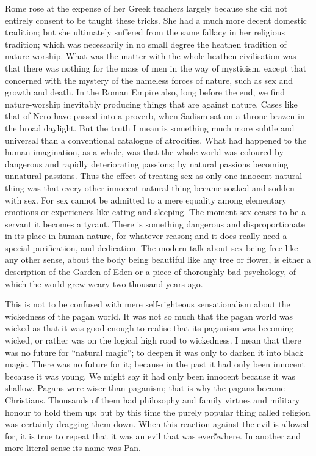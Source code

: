 \documentclass{book}
\begin{document}
Rome rose at the expense of her Greek teachers largely because she did not entirely consent to be taught these tricks. She had a much more decent domestic tradition; but she ultimately suffered from the same fallacy in her religious tradition; which was necessarily in no small degree the heathen tradition of nature-worship. What was the matter with the whole heathen civilisation was that there was nothing for the mass of men in the way of mysticism, except that concerned with the mystery of the nameless forces of nature, such as sex and growth and death. In the Roman Empire also, long before the end, we find nature-worship inevitably producing things that are against nature. Cases like that of Nero have passed into a proverb, when Sadism sat on a throne brazen in the broad daylight. But the truth I mean is something much more subtle and universal than a conventional catalogue of atrocities. What had happened to the human imagination, as a whole, was that the whole world was coloured by dangerous and rapidly deteriorating passions; by natural passions becoming unnatural passions. Thus the effect of treating sex as only one innocent natural thing was that every other innocent natural thing became soaked and sodden with sex. For sex cannot be admitted to a mere equality among elementary emotions or experiences like eating and sleeping. The moment sex ceases to be a servant it becomes a tyrant. There is something dangerous and disproportionate in its place in human nature, for whatever reason; and it does really need a special purification, and dedication. The modern talk about sex being free like any other sense, about the body being beautiful like any tree or flower, is either a description of the Garden of Eden or a piece of thoroughly bad psychology, of which the world grew weary two thousand years ago.

This is not to be confused with mere self-righteous sensationalism about the wickedness of the pagan world. It was not so much that the pagan world was wicked as that it was good enough to realise that its paganism was becoming wicked, or rather was on the logical high road to wickedness. I mean that there was no future for “natural magic”; to deepen it was only to darken it into black magic. There was no future for it; because in the past it had only been innocent because it was young. We might say it had only been innocent because it was shallow. Pagans were wiser than paganism; that is why the pagans became Christians. Thousands of them had philosophy and family virtues and military honour to hold them up; but by this time the purely popular thing called religion was certainly dragging them down. When this reaction against the evil is allowed for, it is true to repeat that it was an evil that was ever5where. In another and more literal sense its name was Pan.
\end{document}

